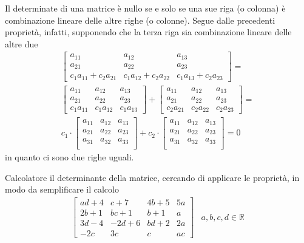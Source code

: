 \begin{pro}
  \label{pro:prodeldet9}
  Il determinate di una matrice è nullo se e solo se una sue riga
  (o colonna) è combinazione lineare delle altre righe (o colonne).
  Segue dalle precedenti proprietà, infatti, supponendo che la terza riga
  sia combinazione lineare delle altre due
  \begin{eqnarray*}
    \begin{bmatrix}
      a_{11} & a_{12} & a_{13}\\
      a_{21} & a_{22} & a_{23}\\
      c_1a_{11}+c_2a_{21} & c_1a_{12}+c_2a_{22} & c_1a_{13}+c_2a_{23}
    \end{bmatrix}=\\
    \begin{bmatrix}
       a_{11} & a_{12} & a_{13}\\
      a_{21} & a_{22} & a_{23}\\
      c_1a_{11} & c_1a_{12} & c_1a_{13}
    \end{bmatrix}+\begin{bmatrix}
      a_{11} & a_{12} & a_{13}\\
      a_{21} & a_{22} & a_{23}\\
      c_2a_{21} & c_2a_{22} & c_2a_{23}
    \end{bmatrix}=\\c_1\cdot
    \begin{bmatrix}
      a_{11} & a_{12} & a_{13}\\
      a_{21} & a_{22} & a_{23}\\
      a_{31} & a_{32} & a_{33}\\
    \end{bmatrix}+c_2\cdot \begin{bmatrix}
      a_{11} & a_{12} & a_{13}\\
      a_{21} & a_{22} & a_{23}\\
      a_{31} & a_{32} & a_{33}\\
    \end{bmatrix}=0
  \end{eqnarray*}
  in quanto ci sono due righe uguali.
\end{pro}
\begin{es}
  \label{es:prodeldet8}
  Calcolatore il determinante della matrice, cercando di applicare le
  proprietà, in modo da semplificare il calcolo
  \begin{eqnarray*}
    \begin{bmatrix}
      ad+4 & c+7 & 4b+5 & 5a\\
      2b+1 & bc + 1 & b + 1 & a\\
      3d - 4 & -2d + 6 & bd+2 & 2a\\
      -2c & 3c & c & ac
    \end{bmatrix} & a,b,c,d \in \mathds{R}
  \end{eqnarray*}
\end{es}

